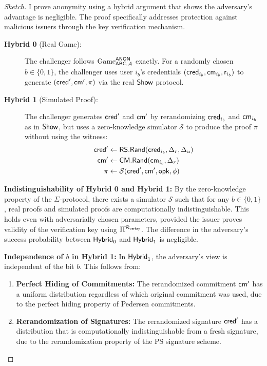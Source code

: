 \begin{proof}[Sketch]
I prove anonymity using a hybrid argument that shows the adversary's advantage is negligible. The proof specifically addresses protection against malicious issuers through the key verification mechanism.

\begin{description}
    \item[\textbf{Hybrid 0} (Real Game):] The challenger follows $\mathrm{Game}_{\mathsf{ABC},\mathcal{A}}^{\mathsf{ANON}}$ exactly. For a randomly chosen $b \in \{0,1\}$, the challenger uses user $i_b$'s credentials $(\mathsf{cred}_{i_b}, \mathsf{cm}_{i_b}, \mathsf{r}_{i_b})$ to generate $(\mathsf{cred}', \mathsf{cm}', \pi)$ via the real $\mathsf{Show}$ protocol. 
    
    \item[\textbf{Hybrid 1} (Simulated Proof):] The challenger generates $\mathsf{cred}'$ and $\mathsf{cm}'$ by rerandomizing $\mathsf{cred}_{i_b}$ and $\mathsf{cm}_{i_b}$ as in $\mathsf{Show}$, but uses a zero-knowledge simulator $\mathcal{S}$ to produce the proof $\pi$ without using the witness:
    \begin{align*}
        \mathsf{cred}' &\gets \mathsf{RS.Rand}(\mathsf{cred}_{i_b}, \Delta_r, \Delta_u)\\
        \mathsf{cm}' &\gets \mathsf{CM.Rand}(\mathsf{cm}_{i_b}, \Delta_r)\\
        \pi &\gets \mathcal{S}(\mathsf{cred}', \mathsf{cm}', \mathsf{opk}, \phi)
    \end{align*}
\end{description}

\noindent\textbf{Indistinguishability of Hybrid 0 and Hybrid 1:} By the zero-knowledge property of the $\Sigma$-protocol, there exists a simulator $\mathcal{S}$ such that for any $b \in \{0,1\}$, real proofs and simulated proofs are computationally indistinguishable. This holds even with adversarially chosen parameters, provided the issuer proves validity of the verification key using $\Pi^{\mathcal{R}_{\mathsf{verkey}}}$. The difference in the adversary's success probability between $\mathsf{Hybrid}_0$ and $\mathsf{Hybrid}_1$ is negligible.

\noindent\textbf{Independence of $b$ in Hybrid 1:} In $\mathsf{Hybrid}_1$, the adversary's view is independent of the bit $b$. This follows from:
\begin{enumerate}
    \item \textbf{Perfect Hiding of Commitments:} The rerandomized commitment $\mathsf{cm}'$ has a uniform distribution regardless of which original commitment was used, due to the perfect hiding property of Pedersen commitments.
    
    \item \textbf{Rerandomization of Signatures:} The rerandomized signature $\mathsf{cred}'$ has a distribution that is computationally indistinguishable from a fresh signature, due to the rerandomization property of the PS signature scheme.
    

\end{enumerate}
\end{proof}
